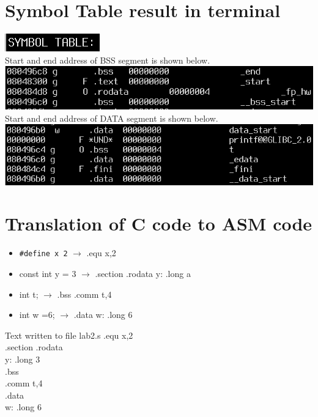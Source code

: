 \documentclass{article}
\begin{document}
\section*{Symbol Table result in terminal}
\includegraphics[scale =0.5]{st.png} \\
Start and end address of BSS segment is shown below. \\
\includegraphics[scale =0.5]{bssadd.png} \\
Start and end address of DATA segment is shown below. \\
\includegraphics[scale =0.5]{dataadd.png} \\
\clearpage

\section*{Translation of C code to ASM code}
\begin{itemize}
\item \verb|#define x 2| 	$\rightarrow$ .equ x,2
\item const int y = 3 	$\rightarrow$ .section .rodata y: .long a
\item int t;		$\rightarrow$ .bss .comm t,4
\item int w =6;		$\rightarrow$ .data w: .long 6
\end{itemize}
\begin{GFT}{Text written to file lab2.s}
\+.equ x,2\\
\+.section .rodata\\
\+y: .long 3\\
\+.bss\\
\+.comm t,4\\
\+.data\\
\+w: .long 6\\
\end{GFT}
\clearpage
\end{document}

